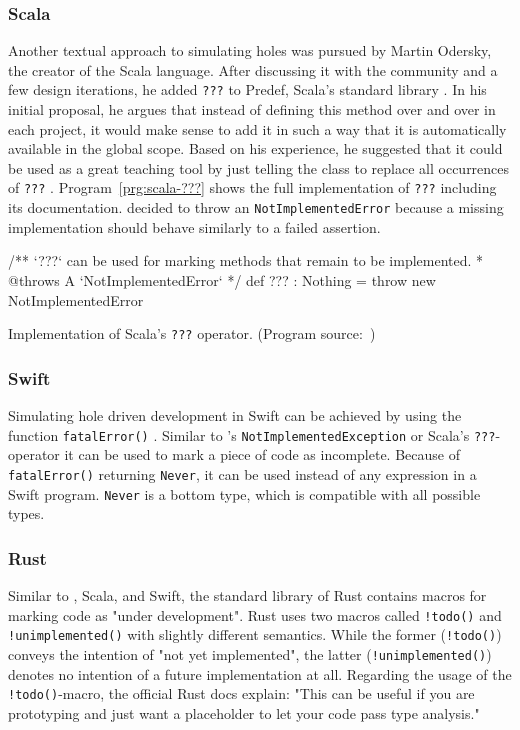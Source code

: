 \subsubsection{Scala}
Another textual approach to simulating holes was pursued by Martin Odersky, the creator of the Scala language.
After discussing it with the community and a few design iterations, he added \texttt{???} to Predef, Scala's standard library \cite{odersky_adding_2011}.
In his initial proposal, he argues that instead of defining this method over and over in each project, it would make sense to add it in such a way that it is automatically available in the global scope.
Based on his experience, he suggested that it could be used as a great teaching tool by just telling the class to replace all occurrences of \texttt{???} \cite{odersky_adding_2011}.
Program~\ref{prg:scala-???} shows the full implementation of \texttt{???} including its documentation.
\citeauthor{odersky_adding_2011} decided to throw an \texttt{NotImplementedError} because a missing implementation should behave similarly to a failed assertion.
%
\begin{program}[ht]
\begin{GenericCode}
/** `???` can be used for marking methods that remain to be implemented.
* @throws A `NotImplementedError`
*/
def ??? : Nothing = throw new NotImplementedError
\end{GenericCode}
\caption{Implementation of Scala's \texttt{???} operator. (Program source:~\cite{odersky_adding_2011})}
\label{prg:scala-???}
\end{program}

\subsubsection{Swift}
Simulating hole driven development in Swift can be achieved by using the function \texttt{fatalError()} \cite{martinez_hole_2018}.
Similar to \CS's \texttt{NotImplementedException} or Scala's \texttt{???}-operator it can be used to mark a piece of code as incomplete.
Because of \texttt{fatalError()} returning \texttt{Never}, it can be used instead of any expression in a Swift program.
\texttt{Never} is a bottom type, which is compatible with all possible types.

\subsubsection{Rust}
Similar to \CS, Scala, and Swift, the standard library of Rust contains macros for marking code as "under development".
Rust uses two macros called \texttt{!todo()} \cite{the_rust_project_developers_todo_2023} and \texttt{!unimplemented()} \cite{the_rust_project_developers_unimplemented_2023} with slightly different semantics.
While the former (\texttt{!todo()}) conveys the intention of "not yet implemented", the latter (\texttt{!unimplemented()}) denotes no intention of a future implementation at all.
Regarding the usage of the \texttt{!todo()}-macro, the official Rust docs explain: "This can be useful if you are prototyping and just want a placeholder to let your code pass type analysis." \cite{the_rust_project_developers_todo_2023}

